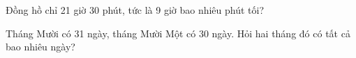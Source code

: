 \begin{ex} %
Đồng hồ chỉ 21 giờ 30 phút, tức là 9 giờ bao nhiêu phút tối?
\end{ex}

\begin{ex} %
Tháng Mười có 31 ngày, tháng Mười Một có 30 ngày. Hỏi hai tháng đó có tất cả bao nhiêu ngày?
\end{ex}
